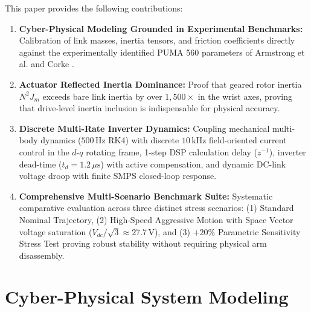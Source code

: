 \documentclass[journal,10pt,twocolumn]{IEEEtran}
\begin{document}
This paper provides the following contributions:
\begin{enumerate}
    \item \textbf{Cyber-Physical Modeling Grounded in Experimental Benchmarks:} Calibration of link masses, inertia tensors, and friction coefficients directly against the experimentally identified PUMA 560 parameters of Armstrong et al. \cite{armstrong1988experimental} and Corke \cite{corke1996robot}.
    \item \textbf{Actuator Reflected Inertia Dominance:} Proof that geared rotor inertia $N^2 J_m$ exceeds bare link inertia by over $1,500\times$ in the wrist axes, proving that drive-level inertia inclusion is indispensable for physical accuracy.
    \item \textbf{Discrete Multi-Rate Inverter Dynamics:} Coupling mechanical multi-body dynamics ($500\,\text{Hz}$ RK4) with discrete $10\,\text{kHz}$ field-oriented current control in the $d$-$q$ rotating frame, 1-step DSP calculation delay ($z^{-1}$), inverter dead-time ($t_d = 1.2\,\mu\text{s}$) with active compensation, and dynamic DC-link voltage droop with finite SMPS closed-loop response.
    \item \textbf{Comprehensive Multi-Scenario Benchmark Suite:} Systematic comparative evaluation across three distinct stress scenarios: (1) Standard Nominal Trajectory, (2) High-Speed Aggressive Motion with Space Vector voltage saturation ($V_{dc}/\sqrt{3} \approx 27.7\,\text{V}$), and (3) $+20\%$ Parametric Sensitivity Stress Test proving robust stability without requiring physical arm disassembly.
\end{enumerate}

\section{Cyber-Physical System Modeling}
\end{document}
